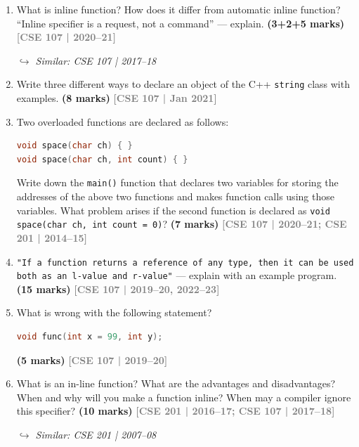 \documentclass[12pt,a3paper]{article}
\newcommand{\yr}[1]{\hfill\textcolor{gray}{\small\textbf{[#1]}}}
\newcommand{\mk}[1]{\textcolor{orange!70!black}{\small\textbf{(#1 marks)}}}
\newcommand{\variant}[1]{\par\vspace{1pt}\textcolor{blue!50!black}%
  {\footnotesize\textit{$\hookrightarrow$ Similar: #1}}}
\begin{document}
\begin{enumerate}
\item What is inline function? How does it differ from automatic inline function? ``Inline specifier is a request, not a command'' --- explain. \mk{3+2+5}
\yr{CSE 107 | 2020--21}
\variant{CSE 107 | 2017--18}




\item Write three different ways to declare an object of the C++ \texttt{string} class with examples. \mk{8}
\yr{CSE 107 | Jan 2021}





\item Two overloaded functions are declared as follows:
\begin{lstlisting}[language=C++]
void space(char ch) { }
void space(char ch, int count) { }
\end{lstlisting}
Write down the \texttt{main()} function that declares two variables for storing the addresses of the above two functions and makes function calls using those variables. What problem arises if the second function is declared as \texttt{void space(char ch, int count = 0)}? \mk{7}
\yr{CSE 107 | 2020--21; CSE 201 | 2014--15}






\item \texttt{"If a function returns a reference of any type, then it can be used both as an l-value and r-value"} --- explain with an example program. \mk{15}
\yr{CSE 107 | 2019--20, 2022--23}




\item What is wrong with the following statement?
\begin{lstlisting}[language=C++]
void func(int x = 99, int y);
\end{lstlisting}
\mk{5}
\yr{CSE 107 | 2019--20}





\item What is an in-line function? What are the advantages and disadvantages? When and why will you make a function inline? When may a compiler ignore this specifier? \mk{10}
\yr{CSE 201 | 2016--17; CSE 107 | 2017--18}
\variant{CSE 201 | 2007--08}


\end{enumerate}
\end{document}
